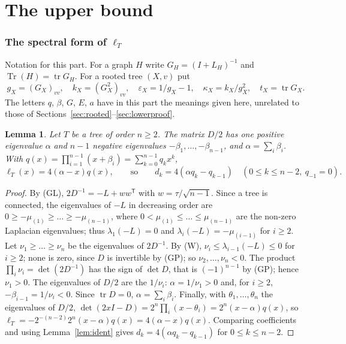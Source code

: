 \documentclass[11pt]{amsart}
\newtheorem{lemma}[theorem]{Lemma}
\theoremstyle{definition}
\theoremstyle{remark}
\newcommand{\tr}{\operatorname{tr}}
\newcommand{\Tr}{\operatorname{Tr}}
\begin{document}
\part*{The upper bound}

\section{The spectral form of \texorpdfstring{$\ell_T$}{l\_T}}\label{sec:spectral}

Notation for this part. For a graph $H$ write $G_H=(I+L_H)^{-1}$ and
$\Tr(H)=\tr G_H$. For a rooted tree $(X,v)$ put
\[
g_X=(G_X)_{vv},\quad k_X=(G_X^2)_{vv},\quad \varepsilon_X=1/g_X-1,\quad
\kappa_X=k_X/g_X^2,\quad t_X=\tr G_X .
\]
The letters $q$, $\beta$, $G$, $E$, $a$ have in this part the meanings given
here, unrelated to those of Sections~\ref{sec:rooted}--\ref{sec:lowerproof}.

\begin{lemma}\label{lem:S40}
Let $T$ be a tree of order $n\ge2$. The matrix $D/2$ has one positive
eigenvalue $\alpha$ and $n-1$ negative eigenvalues
$-\beta_1,\dots,-\beta_{n-1}$, and $\alpha=\sum_i\beta_i$. With
$q(x)=\prod_{i=1}^{n-1}(x+\beta_i)=\sum_{k=0}^{n-1}q_kx^k$,
\[
\ell_T(x)=4(\alpha-x)q(x),\qquad\text{so}\qquad d_k=4(\alpha q_k-q_{k-1})
\quad(0\le k\le n-2,\ q_{-1}=0).
\]
\end{lemma}

\begin{proof}
By (GL), $2D^{-1}=-L+ww^{\mathsf T}$ with $w=\tau/\sqrt{n-1}$. Since a tree is
connected, the eigenvalues of $-L$ in decreasing order are
$0\ge-\mu_{(1)}\ge\dots\ge-\mu_{(n-1)}$, where
$0<\mu_{(1)}\le\dots\le\mu_{(n-1)}$ are the non-zero Laplacian eigenvalues;
thus $\lambda_1(-L)=0$ and $\lambda_i(-L)=-\mu_{(i-1)}$ for $i\ge2$. Let
$\nu_1\ge\dots\ge\nu_n$ be the eigenvalues of $2D^{-1}$. By (W),
$\nu_i\le\lambda_{i-1}(-L)\le0$ for $i\ge2$; none is zero, since $D$ is
invertible by (GP); so $\nu_2,\dots,\nu_n<0$. The product $\prod_i\nu_i=\det(2D^{-1})$
has the sign of $\det D$, that is $(-1)^{n-1}$ by (GP); hence $\nu_1>0$. The
eigenvalues of $D/2$ are the $1/\nu_i$: $\alpha=1/\nu_1>0$ and, for $i\ge2$,
$-\beta_{i-1}=1/\nu_i<0$. Since $\tr D=0$, $\alpha=\sum_i\beta_i$. Finally,
with $\theta_1,\dots,\theta_n$ the eigenvalues of $D/2$,
$\det(2xI-D)=2^n\prod_i(x-\theta_i)=2^n(x-\alpha)q(x)$, so
$\ell_T=-2^{-(n-2)}2^n(x-\alpha)q(x)=4(\alpha-x)q(x)$. Comparing coefficients
and using Lemma~\ref{lem:ident} gives $d_k=4(\alpha q_k-q_{k-1})$ for
$0\le k\le n-2$.
\end{proof}
\end{document}
